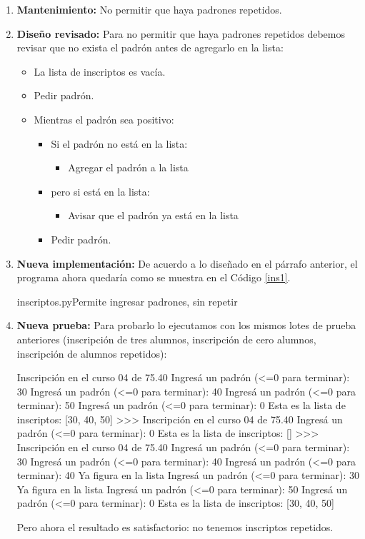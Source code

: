 \begin{enumerate}
\item {\bf Mantenimiento:} No permitir que haya padrones repetidos.

\item {\bf Diseño revisado:} Para no permitir que haya padrones repetidos
debemos revisar que no exista el padrón antes de agregarlo en la lista:

\begin{itemize}
\item La lista de inscriptos es vacía.
\item Pedir padrón.
\item Mientras el padrón sea positivo:
\begin{itemize}
\item Si el padrón no está en la lista:
\begin{itemize}
\item Agregar el padrón a la lista
\end{itemize}
\item pero si está en la lista:
\begin{itemize}
\item Avisar que el padrón ya está en la lista
\end{itemize}
\item Pedir padrón.
\end{itemize}
\end{itemize}

\item {\bf Nueva implementación:}
De acuerdo a lo diseñado en el párrafo anterior, el programa ahora quedaría
como se muestra en el Código \ref{ins1}.

\begin{codigo}{inscriptos.py}{Permite ingresar padrones, sin repetir}
\label{ins1}

\end{codigo}

\item {\bf Nueva prueba:}
Para probarlo lo ejecutamos con los mismos lotes de prueba anteriores
(inscripción de tres alumnos, inscripción de cero alumnos, inscripción de
alumnos repetidos):

\begin{codigo-python-sn}
Inscripción en el curso 04 de 75.40
Ingresá un padrón (<=0 para terminar): 30
Ingresá un padrón (<=0 para terminar): 40
Ingresá un padrón (<=0 para terminar): 50
Ingresá un padrón (<=0 para terminar): 0
Esta es la lista de inscriptos:  [30, 40, 50]
>>>
Inscripción en el curso 04 de 75.40
Ingresá un padrón (<=0 para terminar): 0
Esta es la lista de inscriptos:  []
>>>
Inscripción en el curso 04 de 75.40
Ingresá un padrón (<=0 para terminar): 30
Ingresá un padrón (<=0 para terminar): 40
Ingresá un padrón (<=0 para terminar): 40
Ya figura en la lista
Ingresá un padrón (<=0 para terminar): 30
Ya figura en la lista
Ingresá un padrón (<=0 para terminar): 50
Ingresá un padrón (<=0 para terminar): 0
Esta es la lista de inscriptos:  [30, 40, 50]
\end{codigo-python-sn}

Pero ahora el resultado es satisfactorio: no tenemos inscriptos repetidos.

\end{enumerate}


